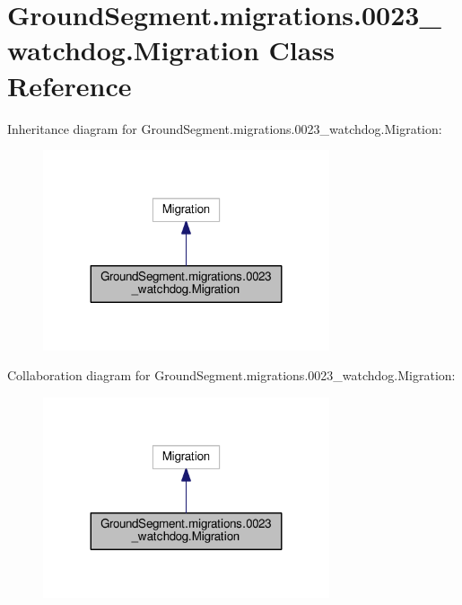 \hypertarget{class_ground_segment_1_1migrations_1_10023__watchdog_1_1_migration}{}\section{Ground\+Segment.\+migrations.0023\+\_\+watchdog.Migration Class Reference}
\label{class_ground_segment_1_1migrations_1_10023__watchdog_1_1_migration}


Inheritance diagram for Ground\+Segment.\+migrations.0023\+\_\+watchdog.Migration\+:\nopagebreak
\begin{figure}[H]
\begin{center}
\leavevmode
\includegraphics[width=239pt]{class_ground_segment_1_1migrations_1_10023__watchdog_1_1_migration__inherit__graph}
\end{center}
\end{figure}


Collaboration diagram for Ground\+Segment.\+migrations.0023\+\_\+watchdog.Migration\+:\nopagebreak
\begin{figure}[H]
\begin{center}
\leavevmode
\includegraphics[width=239pt]{class_ground_segment_1_1migrations_1_10023__watchdog_1_1_migration__coll__graph}
\end{center}
\end{figure}
